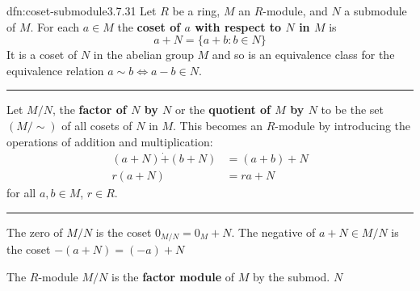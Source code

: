 \documentclass[landscape, 8pt]{extarticle}
\begin{document}
\begin{multicols}{3}
\vspace{-5pt}
\begin{dfn}{dfn:coset-submodule}{3.7.31}
    \vspace{-5pt}
    Let $R$ be a ring, $M$ an $R$-module, and $N$ a submodule of $M$. For each $a\in M$ the \textbf{coset of $a$ with respect to $N$ in $M$} is
    \[a + N = \{ a + b : b\in N\}\]
    It is a coset of $N$ in the abelian group $M$ and so is an equivalence class for the equivalence relation $a \sim b \iff a - b \in N$.

    \vspace{-5pt}
    \noindent\rule{\textwidth}{0.2pt}
    Let $M / N$, the \textbf{factor of $N$ by $N$} or the \textbf{quotient of $M$ by $N$} to be the set $(M / \sim)$ of all cosets of $N$ in $M$. This becomes an $R$-module by introducing the operations of addition and multiplication:
    \begin{align*}
        (a + N) \dot{+} (b + N) &= (a + b) + N\\
        r(a + N) &= ra + N
    \end{align*}
    for all $a,b\in M$, $r\in R$.

    \vspace{-5pt}
    \noindent\rule{\textwidth}{0.2pt}
    The zero of $M / N$ is the coset $0_{M /N} = 0_{M} + N$. The negative of $a + N\in M / N$ is the coset $-(a + N) = (-a) + N$

    The $R$-module $M / N$ is the \textbf{factor module} of $M$ by the submod. $N$
\end{dfn}

\newpage


%
%
%


\end{multicols}
\end{document}
